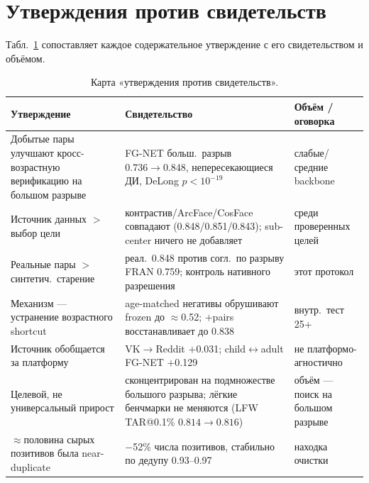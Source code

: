 \documentclass[10pt,twocolumn,letterpaper]{article}
\begin{document}
\section{Утверждения против свидетельств}\label{sup:claims}
Табл.~\ref{tab:claims} сопоставляет каждое содержательное утверждение с его свидетельством и объёмом.

\begin{table}[t]
\centering
\small
\begin{tabular}{@{}p{}p{}p{}@{}}
\toprule
Утверждение & Свидетельство & Объём / оговорка \\
\midrule
Добытые пары улучшают кросс-возрастную верификацию на большом разрыве & FG-NET больш.\ разрыв $0.736\!\rightarrow\!0.848$, непересекающиеся ДИ, DeLong $p<10^{-19}$ & слабые/средние backbone \\
Источник данных $>$ выбор цели & контрастив/ArcFace/CosFace совпадают (0.848/0.851/0.843); sub-center ничего не добавляет & среди проверенных целей \\
Реальные пары $>$ синтетич.\ старение & реал.\ 0.848 против согл.\ по разрыву FRAN 0.759; контроль нативного разрешения & этот протокол \\
Механизм — устранение возрастного shortcut & age-matched негативы обрушивают frozen до $\approx$0.52; $+$pairs восстанавливает до 0.838 & внутр.\ тест 25+ \\
Источник обобщается за платформу & VK$\to$Reddit $+$0.031; child$\leftrightarrow$adult FG-NET $+$0.129 & не платформо-агностично \\
Целевой, не универсальный прирост & сконцентрирован на подмножестве большого разрыва; лёгкие бенчмарки не меняются (LFW TAR@0.1\% $0.814\!\rightarrow\!0.816$) & объём — поиск на большом разрыве \\
$\approx$половина сырых позитивов была near-duplicate & $-$52\% числа позитивов, стабильно по дедупу 0.93--0.97 & находка очистки \\
\bottomrule
\end{tabular}
\caption{Карта «утверждения против свидетельств».}
\label{tab:claims}
\end{table}
\end{document}
